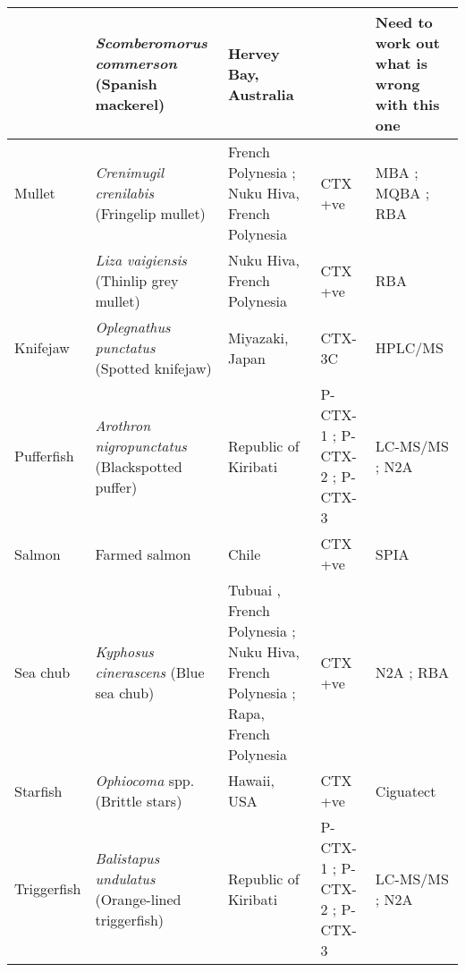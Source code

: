 \documentclass[12pt]{article}
\begin{document}
\begin{longtable}[l]{ | p{2cm} | p{3cm} | p{4.5cm} | p{2cm} | p{3cm} | }
	& \emph{Scomberomorus commerson} (Spanish mackerel) & Hervey Bay, Australia \cite{} & & Need to work out what is wrong with this one\\ %
	\hline
	Mullet & \emph{Crenimugil crenilabis} (Fringelip mullet) & French Polynesia \cite{bagnis1987use}; Nuku Hiva, French Polynesia \cite{darius2007ciguatera} & CTX +ve \cite{darius2007ciguatera} & MBA \cite{bagnis1987use}; MQBA \cite{bagnis1987use}; RBA \cite{darius2007ciguatera}\\
	& \emph{Liza vaigiensis} (Thinlip grey mullet) & Nuku Hiva, French Polynesia \cite{darius2007ciguatera} & CTX +ve \cite{darius2007ciguatera} & RBA \cite{darius2007ciguatera} \\
	\hline
	Knifejaw & \emph{Oplegnathus punctatus} (Spotted knifejaw) & Miyazaki, Japan \cite{yogi2011detailed} & CTX-3C \cite{yogi2011detailed} & HPLC/MS \cite{yogi2011detailed}\\
	\hline
Pufferfish & \emph{Arothron nigropunctatus} (Blackspotted puffer) & Republic of Kiribati \cite{mak2013pacific} & P-CTX-1 \cite{mak2013pacific}; P-CTX-2 \cite{mak2013pacific}; P-CTX-3 \cite{mak2013pacific} & LC-MS/MS \cite{mak2013pacific}; N2A \cite{mak2013pacific} \\
\hline
	Salmon & Farmed salmon & Chile \cite{ebesu1994first} & CTX +ve \cite{ebesu1994first} & SPIA \cite{ebesu1994first}\\
	\hline
	Sea chub & \emph{Kyphosus cinerascens} (Blue sea chub) & Tubuai , French Polynesia \cite{darius2007ciguatera}; Nuku Hiva, French Polynesia \cite{darius2007ciguatera}; Rapa, French Polynesia \cite{pawlowiez2013evaluation} & CTX +ve \cite{pawlowiez2013evaluation,darius2007ciguatera} & N2A \cite{pawlowiez2013evaluation}; RBA \cite{darius2007ciguatera} \\
	\hline
	Starfish & \emph{Ophiocoma} spp. (Brittle stars) & Hawaii, USA \cite{park2000microbial} & CTX +ve \cite{park2000microbial} & Ciguatect \textregistered \cite{park2000microbial} \\
	\hline
Triggerfish	& \emph{Balistapus undulatus} (Orange-lined triggerfish) & Republic of Kiribati \cite{mak2013pacific} & P-CTX-1 \cite{mak2013pacific}; P-CTX-2 \cite{mak2013pacific}; P-CTX-3 \cite{mak2013pacific} & LC-MS/MS \cite{mak2013pacific}; N2A \cite{mak2013pacific} \\
\hline
	\end{longtable}
\end{document}
